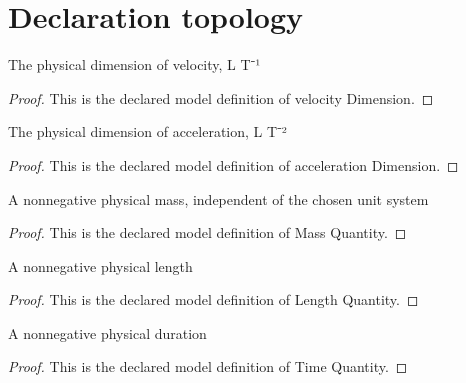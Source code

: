 \section{Declaration topology}
\begin{definition}
  \label{def:physics:phyx-mini-0768:phyxminiproblems-problemphyxmini0768-velocitydimension}
  The physical dimension of velocity, L T⁻¹
\end{definition}
\begin{proof}
  This is the declared model definition of velocity Dimension.
\end{proof}
\begin{definition}
  \label{def:physics:phyx-mini-0768:phyxminiproblems-problemphyxmini0768-accelerationdimension}
  The physical dimension of acceleration, L T⁻²
\end{definition}
\begin{proof}
  This is the declared model definition of acceleration Dimension.
\end{proof}
\begin{definition}
  \label{def:physics:phyx-mini-0768:phyxminiproblems-problemphyxmini0768-massquantity}
  A nonnegative physical mass, independent of the chosen unit system
\end{definition}
\begin{proof}
  This is the declared model definition of Mass Quantity.
\end{proof}
\begin{definition}
  \label{def:physics:phyx-mini-0768:phyxminiproblems-problemphyxmini0768-lengthquantity}
  A nonnegative physical length
\end{definition}
\begin{proof}
  This is the declared model definition of Length Quantity.
\end{proof}
\begin{definition}
  \label{def:physics:phyx-mini-0768:phyxminiproblems-problemphyxmini0768-timequantity}
  A nonnegative physical duration
\end{definition}
\begin{proof}
  This is the declared model definition of Time Quantity.
\end{proof}

